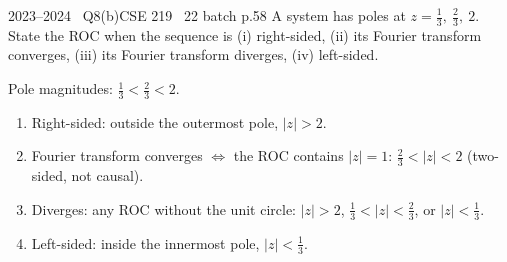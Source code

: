 \begin{qcard}{2023--2024 \textbullet\ Q8(b)}{CSE 219 \textbullet\ 22 batch p.5}{8}
A system has poles at $z=\frac13,\ \frac23,\ 2$. State the ROC when the sequence is (i) right-sided, (ii) its Fourier transform converges, (iii) its Fourier transform diverges, (iv) left-sided.
\end{qcard}
\begin{solution}
Pole magnitudes: $\frac13<\frac23<2$.
\begin{enumerate}[label=(\roman*),leftmargin=2em,itemsep=2pt]
\item Right-sided: outside the outermost pole, $|z|>2$.
\item Fourier transform converges $\Leftrightarrow$ the ROC contains $|z|=1$: $\frac23<|z|<2$ (two-sided, not causal).
\item Diverges: any ROC without the unit circle: $|z|>2$, $\frac13<|z|<\frac23$, or $|z|<\frac13$.
\item Left-sided: inside the innermost pole, $|z|<\frac13$.
\end{enumerate}
\end{solution}

